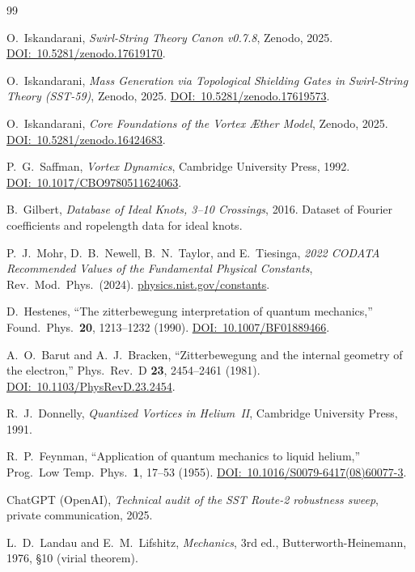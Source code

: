 \documentclass[11pt,a4paper]{article}
\begin{document}
\begin{thebibliography}{99}

O.~Iskandarani,
\textit{Swirl-String Theory Canon v0.7.8},
Zenodo, 2025.
\href{https://doi.org/10.5281/zenodo.17619170}{DOI:~10.5281/zenodo.17619170}.

O.~Iskandarani,
\textit{Mass Generation via Topological Shielding Gates in
Swirl-String Theory (SST-59)},
Zenodo, 2025.
\href{https://doi.org/10.5281/zenodo.17619573}{DOI:~10.5281/zenodo.17619573}.

O.~Iskandarani,
\textit{Core Foundations of the Vortex \AE{}ther Model},
Zenodo, 2025.
\href{https://doi.org/10.5281/zenodo.16424683}{DOI:~10.5281/zenodo.16424683}.

P.~G.~Saffman,
\textit{Vortex Dynamics},
Cambridge University Press, 1992.
\href{https://doi.org/10.1017/CBO9780511624063}{DOI:~10.1017/CBO9780511624063}.

B.~Gilbert,
\textit{Database of Ideal Knots, 3--10 Crossings},
2016.
Dataset of Fourier coefficients and ropelength data for ideal knots.

P.~J.~Mohr, D.~B.~Newell, B.~N.~Taylor, and E.~Tiesinga,
\textit{2022 CODATA Recommended Values of the Fundamental
Physical Constants},
Rev.\ Mod.\ Phys.\ (2024).
\href{https://physics.nist.gov/constants}{physics.nist.gov/constants}.

D.~Hestenes,
``The zitterbewegung interpretation of quantum mechanics,''
Found.\ Phys.\ \textbf{20}, 1213--1232 (1990).
\href{https://doi.org/10.1007/BF01889466}{DOI:~10.1007/BF01889466}.

A.~O.~Barut and A.~J.~Bracken,
``Zitterbewegung and the internal geometry of the electron,''
Phys.\ Rev.\ D \textbf{23}, 2454--2461 (1981).
\href{https://doi.org/10.1103/PhysRevD.23.2454}{DOI:~10.1103/PhysRevD.23.2454}.

R.~J.~Donnelly,
\textit{Quantized Vortices in Helium~II},
Cambridge University Press, 1991.

R.~P.~Feynman,
``Application of quantum mechanics to liquid helium,''
Prog.\ Low Temp.\ Phys.\ \textbf{1}, 17--53 (1955).
\href{https://doi.org/10.1016/S0079-6417(08)60077-3}{DOI:~10.1016/S0079-6417(08)60077-3}.

ChatGPT (OpenAI),
\textit{Technical audit of the SST Route-2 robustness sweep},
private communication, 2025.

L.~D.~Landau and E.~M.~Lifshitz,
\textit{Mechanics}, 3rd ed.,
Butterworth-Heinemann, 1976, \S10 (virial theorem).

\end{thebibliography}
\end{document}
